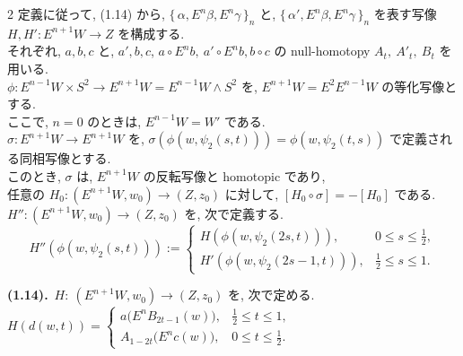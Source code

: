 \documentclass[10pt, leqno]{ltjsarticle}
\newcommand{\Ex}{E}        %
\newcommand{\todai}[2][]{\{\,#2\,\}_{#1}}      %
\numberwithin{equation}{section}
\theoremstyle{plain}
\theoremstyle{definition}
\theoremstyle{remark}
\begin{document}
\begin{paracol}{2}
定義に従って, (1.14) から,
\(\todai[n]{\alpha, E^n\beta, E^n\gamma}\) と,
\(\todai[n]{\alpha', E^n\beta, E^n\gamma}\) を表す写像\\ 
$H,H':E^{n+1}W\to Z$ を構成する.\\
それぞれ, $a,b,c$ と, $a',b,c$, 
\(a\circ E^n b,\ a'\circ E^n b, b\circ c\)
の null-homotopy $A_t,\ A'_t,\ B_t$ を用いる. \\
\(\phi: E^{n-1}W\times S^2\to E^{n+1}W = E^{n-1}W\wedge S^2\)
を, \(E^{n+1}W = E^2 E^{n-1}W\) の等化写像とする.\\
ここで, \(n=0\) のときは, \(E^{n-1}W = W'\) である.\\
\(\sigma:E^{n+1}W\to E^{n+1}W\) を,
\(\sigma(\phi(w, \psi_2(s, t)))
= \phi(w, \psi_2(t, s))\)
で定義される同相写像とする.\\
このとき,
\(\sigma\) は,
\(E^{n+1}W\) の反転写像と homotopic であり,\\
任意の \(H_0:(E^{n+1}W,w_0)\to(Z,z_0)\) に対して,
\([H_0\circ\sigma] = -[H_0]\) である.\\
$H'':(E^{n+1}W,w_0)\to(Z,z_0)$ を, 次で定義する.
\[
H''(\phi(w,\psi_2(s, t))) :=
\begin{cases}
H(\phi(w, \psi_2(2s, t))), & 0\le s\le \tfrac12,\\
H'(\phi(w, \psi_2(2s-1, t))), & \tfrac12\le s\le 1.
\end{cases}
\]

\switchcolumn

\noindent
\textbf{(1.14).}\ $H:\ (\Ex^{n+1}W,w_0)\to (Z,z_0)$ を, 次で定める. \\
\(
H(d(w,t))=
\begin{cases}
a\bigl(\Ex^n B_{2t-1}(w)\bigr), & \tfrac12\le t\le 1,\\[2mm]
A_{1-2t}\bigl(\Ex^n c(w)\bigr), & 0\le t\le \tfrac12.
\end{cases}
\)

\end{paracol}
\end{document}
